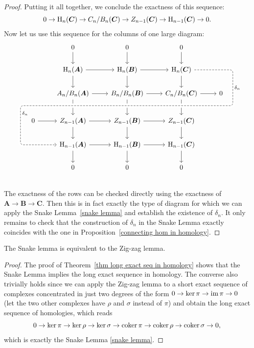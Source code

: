 \begin{proof}
    Putting it all together, we conclude the exactness of this sequence:
    \[0\to \mathrm{H}_n(\boldsymbol{C})\to C_n/B_n(\boldsymbol{C})\to Z_{n-1}(\boldsymbol{C})\to \mathrm{H}_{n-1}(\boldsymbol{C})\to 0.\]
    Now let us use this sequence for the columns of one large diagram:
    \[\begin{tikzcd}
        && 0\ar{d}& 0\ar{d} &0\ar{d} &&\\
        & & \rmH_n(\bm{A}) \ar{r} \ar{d} & \rmH_n(\bm{B})\ar{r} \ar{d} &  \rmH_n(\bm{C}) \ar{d}   %
        & & \\
        &  &  A_n/B_n(\bm{A}) \ar{r} & B_n/B_n(\bm{B}) \ar{r} \ar{dd} &  C_n/B_n(\bm{C})\ar{r}\ar{dd} & 0 &  ~\\[-10pt]
        & & &  ~ & & \ar[r, phantom, ""{coordinate, name=Y}] & ~\\[-10pt]
        ~&  \ar[l, phantom, ""{coordinate, name=Z}] 0 \ar{r} &  Z_{n-1}(\bm{A}) \ar[uu,leftarrow,crossing over]\ar{r} \ar{d} &  Z_{n-1}(\bm{B}) \ar{r} \ar{d} &  Z_{n-1}(\bm{C}) \ar{d} & &  \\
              & &  \ar[from=uuuurr, "\delta_n", dashed,crossing over, rounded corners,
                      to path=
                              { -- ([xshift=2ex]\tikztostart.east)
                              -| (Y) [near end]\tikztonodes
                              -| (Z) [near end]\tikztonodes
                              |- ([xshift=-2ex]\tikztotarget.west)
                               -- (\tikztotarget)}
                    ] \rmH_{n-1}(\bm{A})\ar{r}\ar{d}
               &  \rmH_{n-1}(\bm{B}) \ar{r}\ar{d}
               &  \rmH_{n-1}(\bm{C})\ar{d}
               & 
               & \\
        && 0& 0 &0 &&\\
    \end{tikzcd}\]
    The exactness of the rows can be checked directly using the exactness of $\bm{A}\to \bm{B}\to\bm{C}$. Then this is in fact exactly the type of diagram for which we can apply the Snake Lemma~\ref{snake lemma} and establish the existence of $\delta_n$. It only remains to check that the construction of $\delta_n$ in the Snake Lemma exactly coincides with the one in Proposition~\ref{connecting hom in homology}.
\end{proof}
\begin{cor}
    The Snake lemma is equivalent to the Zig-zag lemma.
\end{cor}
\begin{proof}
     The proof of Theorem~\ref{thm long exact seq in homology} shows that the Snake Lemma implies the long exact sequence in homology. The converse also trivially holds since we can apply the Zig-zag lemma to a short exact sequence of complexes concentrated in just two degrees of the form $0\to \ker\pi \to \operatorname{im}\pi \to 0$ (let the two other complexes have $\rho $ and $\sigma$ instead of $\pi$) and obtain the long exact sequence of homologies, which reads
    \[0\to \ker\pi \to \ker\rho\to \ker\sigma\to \operatorname{coker}\pi\to \operatorname{coker}\rho\to\operatorname{coker}\sigma\to 0, \]
    which is exactly the Snake Lemma \ref{snake lemma}.
\end{proof}


